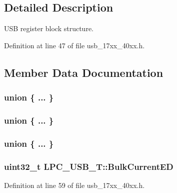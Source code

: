 \subsection{Detailed Description}
U\+SB register block structure. 

Definition at line 47 of file usb\+\_\+17xx\+\_\+40xx.\+h.



\subsection{Member Data Documentation}
\subsubsection[{\texorpdfstring{"@14}{@14}}]{\setlength{\rightskip}{0pt plus 5cm}union \{ ... \} }\hypertarget{structLPC__USB__T_a4df31f7282fd67f01362689c807e9eed}{}\label{structLPC__USB__T_a4df31f7282fd67f01362689c807e9eed}
\subsubsection[{\texorpdfstring{"@16}{@16}}]{\setlength{\rightskip}{0pt plus 5cm}union \{ ... \} }\hypertarget{structLPC__USB__T_a2430ca9b47d8eb641dcebc5f215ae879}{}\label{structLPC__USB__T_a2430ca9b47d8eb641dcebc5f215ae879}
\subsubsection[{\texorpdfstring{"@18}{@18}}]{\setlength{\rightskip}{0pt plus 5cm}union \{ ... \} }\hypertarget{structLPC__USB__T_ac5aa587493129068a94dc68da3fa4849}{}\label{structLPC__USB__T_ac5aa587493129068a94dc68da3fa4849}
\subsubsection[{\texorpdfstring{Bulk\+Current\+ED}{BulkCurrentED}}]{ uint32\+\_\+t L\+P\+C\+\_\+\+U\+S\+B\+\_\+\+T\+::\+Bulk\+Current\+ED}\hypertarget{structLPC__USB__T_a5ce486c6446a140dd9db34f23373f15c}{}\label{structLPC__USB__T_a5ce486c6446a140dd9db34f23373f15c}


Definition at line 59 of file usb\+\_\+17xx\+\_\+40xx.\+h.

